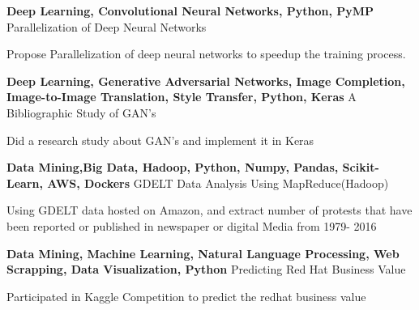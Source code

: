 \begin{cventries}
  \cventry
    {\textbf{Deep Learning, Convolutional Neural Networks, Python, PyMP}} %
    {Parallelization of Deep Neural Networks} %
    {} %
    {} %
    {
      \begin{cvitems} %
        \item {Propose Parallelization of deep neural networks to speedup the training process.}
      \end{cvitems}
    }
  \cventry
    {\textbf{Deep Learning, Generative Adversarial Networks, Image
Completion, Image-to-Image Translation, Style Transfer, Python, Keras}} %
    {A Bibliographic Study of GAN's} %
    {} %
    {} %
    {
      \begin{cvitems} %
        \item {Did a research study about GAN's and implement it in Keras}
      \end{cvitems}
    }
    
  \cventry
    {\textbf{Data Mining,Big Data, Hadoop, Python, Numpy, Pandas, Scikit-Learn, AWS, Dockers}} %
    {GDELT Data Analysis Using MapReduce(Hadoop)} %
    {} %
    {} %
    {
      \begin{cvitems} %
        \item {Using GDELT data hosted on Amazon, and extract number of protests that have been reported or published in newspaper or digital Media from 1979- 2016 }
      \end{cvitems}
    }
  \cventry
    {\textbf{Data Mining, Machine Learning, Natural Language Processing, Web Scrapping, Data Visualization, Python}} %
    {Predicting Red Hat Business Value} %
    {} %
    {} %
    {
      \begin{cvitems} %
        \item {Participated in Kaggle Competition to predict the redhat business value}
      \end{cvitems}
    }
\end{cventries}
